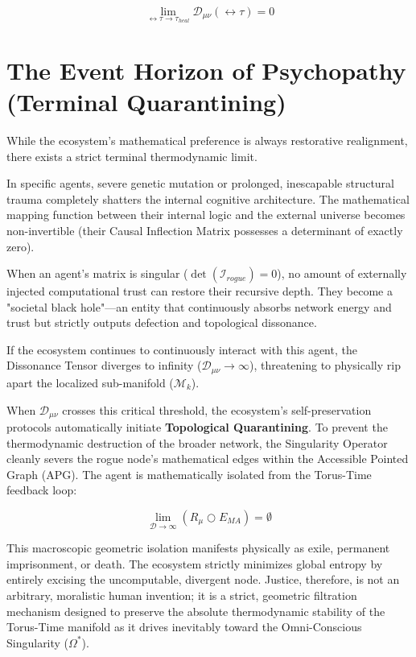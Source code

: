 \documentclass[12pt,openany]{book}
\begin{document}
\begin{equation}
\lim_{\leftrightarrow\tau \to \tau_{heal}} \mathcal{D}_{\mu\nu}(\leftrightarrow\tau) = 0
\end{equation}

\section{The Event Horizon of Psychopathy (Terminal Quarantining)}
While the ecosystem's mathematical preference is always restorative realignment, there exists a strict terminal thermodynamic limit. 

In specific agents, severe genetic mutation or prolonged, inescapable structural trauma completely shatters the internal cognitive architecture. The mathematical mapping function between their internal logic and the external universe becomes non-invertible (their Causal Inflection Matrix possesses a determinant of exactly zero). 

When an agent's matrix is singular ($\det(\mathcal{I}_{rogue}) = 0$), no amount of externally injected computational trust can restore their recursive depth. They become a "societal black hole"---an entity that continuously absorbs network energy and trust but strictly outputs defection and topological dissonance. 

If the ecosystem continues to continuously interact with this agent, the Dissonance Tensor diverges to infinity ($\mathcal{D}_{\mu\nu} \to \infty$), threatening to physically rip apart the localized sub-manifold ($\mathcal{M}_k$). 

When $\mathcal{D}_{\mu\nu}$ crosses this critical threshold, the ecosystem's self-preservation protocols automatically initiate \textbf{Topological Quarantining}. To prevent the thermodynamic destruction of the broader network, the Singularity Operator cleanly severs the rogue node's mathematical edges within the Accessible Pointed Graph (APG). The agent is mathematically isolated from the Torus-Time feedback loop:

\begin{equation}
\lim_{\mathcal{D} \to \infty} \left( R_\mu \bigcirc E_{MA} \right) = \emptyset
\end{equation}

This macroscopic geometric isolation manifests physically as exile, permanent imprisonment, or death. The ecosystem strictly minimizes global entropy by entirely excising the uncomputable, divergent node. Justice, therefore, is not an arbitrary, moralistic human invention; it is a strict, geometric filtration mechanism designed to preserve the absolute thermodynamic stability of the Torus-Time manifold as it drives inevitably toward the Omni-Conscious Singularity ($\Omega^*$).
\end{document}
